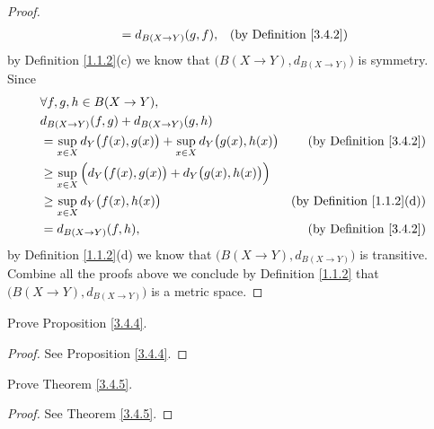 \begin{proof}
\begin{align*}
                                                          & = d_{B(X \to Y)}(g, f),                  & \text{(by Definition \ref{3.4.2})}
    \end{align*}
    by Definition \ref{1.1.2}(c) we know that \(\big(B(X \to Y), d_{B(X \to Y)}\big)\) is symmetry.
    Since
    \begin{align*}
         & \forall f, g, h \in B(X \to Y),                                                                                           \\
         & d_{B(X \to Y)}(f, g) + d_{B(X \to Y)}(g, h)                                                                               \\
         & = \sup_{x \in X} d_Y\big(f(x), g(x)\big) + \sup_{x \in X} d_Y\big(g(x), h(x)\big) & \text{(by Definition \ref{3.4.2})}    \\
         & \geq \sup_{x \in X} \Big(d_Y\big(f(x), g(x)\big) + d_Y\big(g(x), h(x)\big)\Big)                                           \\
         & \geq \sup_{x \in X} d_Y\big(f(x), h(x)\big)                                       & \text{(by Definition \ref{1.1.2}(d))} \\
         & = d_{B(X \to Y)}(f, h),                                                           & \text{(by Definition \ref{3.4.2})}
    \end{align*}
    by Definition \ref{1.1.2}(d) we know that \(\big(B(X \to Y), d_{B(X \to Y)}\big)\) is transitive.
    Combine all the proofs above we conclude by Definition \ref{1.1.2} that \(\big(B(X \to Y), d_{B(X \to Y)}\big)\) is a metric space.
\end{proof}

\begin{exercise}\label{ex 3.4.2}
    Prove Proposition \ref{3.4.4}.
\end{exercise}

\begin{proof}
    See Proposition \ref{3.4.4}.
\end{proof}

\begin{exercise}\label{ex 3.4.3}
    Prove Theorem \ref{3.4.5}.
\end{exercise}

\begin{proof}
    See Theorem \ref{3.4.5}.
\end{proof}

